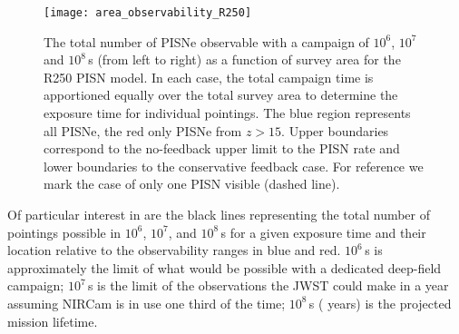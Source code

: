 \documentclass[../thesis.tex]{subfiles}
\begin{document}
\begin{figure}
\begin{center}
  \texttt{[image: area\_observability\_R250]}
  \caption{The total number of PISNe observable with a
    campaign of $10^6$, $10^7$ and $10^8\,$s (from left to right) as a
    function of survey area for the R250 PISN model.  In each case,
    the total campaign time is apportioned equally over the total
    survey area to determine the exposure time for individual
    pointings.  The blue region represents all PISNe, the red only
    PISNe from $z>15$.  Upper boundaries correspond to the no-feedback
    upper limit to the PISN rate and lower boundaries to the
    conservative feedback case. For reference we mark the case of only
    one PISN visible (dashed line).}
 \label{area_obsR250}
\end{center}
\end{figure}  
Of particular interest in  are the black lines
representing the total number of pointings possible in $10^6$, $10^7$,
and $10^8\,$s for a given exposure time and their location relative to
the observability ranges in blue and red.  $10^6\,$s is approximately
the limit of what would be possible with a dedicated deep-field
campaign; $10^7\,$s is the limit of the observations the JWST could
make in a year assuming NIRCam is in use one third of the time;
$10^8\,$s ( years) is the projected mission lifetime. 
\end{document}
